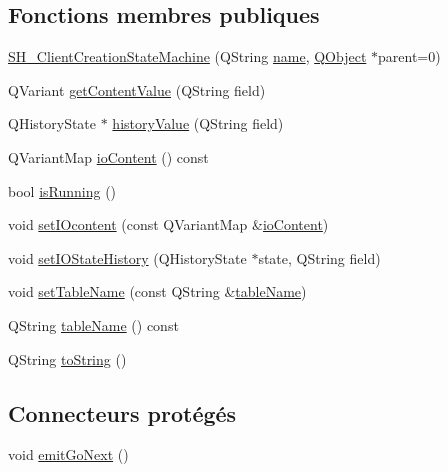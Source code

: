\subsection*{Fonctions membres publiques}
\begin{DoxyCompactItemize}
\item 
\hyperlink{classSH__ClientCreationStateMachine_a0b406b0f404c0fd33bf35be8ce0cc811}{S\-H\-\_\-\-Client\-Creation\-State\-Machine} (Q\-String \hyperlink{classSH__NamedObject_a9f686c6f2a5bcc08ad03d0cee0151f0f}{name}, \hyperlink{classQObject}{Q\-Object} $\ast$parent=0)
\item 
Q\-Variant \hyperlink{classSH__InOutStateMachine_aa1a3bd3c0ea8a59b9bc916dc718eb9ca}{get\-Content\-Value} (Q\-String field)
\item 
Q\-History\-State $\ast$ \hyperlink{classSH__InOutStateMachine_af71bfdb3b59b7bf2763588b513b4205f}{history\-Value} (Q\-String field)
\item 
Q\-Variant\-Map \hyperlink{classSH__InOutStateMachine_aaca105fbd5f5cc3bac115389ad3694c5}{io\-Content} () const 
\item 
bool \hyperlink{classSH__GenericStateMachine_a7e650d582a4c1b8cf2869fb5873b36a9}{is\-Running} ()
\item 
void \hyperlink{classSH__InOutStateMachine_a8271a7ec7d5f6502449dd3b4da5f4155}{set\-I\-Ocontent} (const Q\-Variant\-Map \&\hyperlink{classSH__InOutStateMachine_aaca105fbd5f5cc3bac115389ad3694c5}{io\-Content})
\item 
void \hyperlink{classSH__InOutStateMachine_acbcce2c4300af1634d928b30e5e9be1c}{set\-I\-O\-State\-History} (Q\-History\-State $\ast$state, Q\-String field)
\item 
void \hyperlink{classSH__InOutStateMachine_a95db31a7e7f31f36a8737adc739ab08c}{set\-Table\-Name} (const Q\-String \&\hyperlink{classSH__InOutStateMachine_a4288a6c86ddf83effefff886675591c9}{table\-Name})
\item 
Q\-String \hyperlink{classSH__InOutStateMachine_a4288a6c86ddf83effefff886675591c9}{table\-Name} () const 
\item 
Q\-String \hyperlink{classSH__GenericStateMachine_a85c0c1c9d258ae991f84667412fa47cd}{to\-String} ()
\end{DoxyCompactItemize}
\subsection*{Connecteurs protégés}
\begin{DoxyCompactItemize}
\item 
void \hyperlink{classSH__GenericStateMachine_a2e162a1da1f694d433cb9072b37ac530}{emit\-Go\-Next} ()
\end{DoxyCompactItemize}
